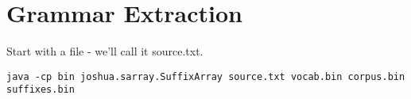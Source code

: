 \chapter{Grammar Extraction}

Start with a file - we'll call it source.txt. 

\begin{verbatim}
java -cp bin joshua.sarray.SuffixArray source.txt vocab.bin corpus.bin suffixes.bin
\end{verbatim}